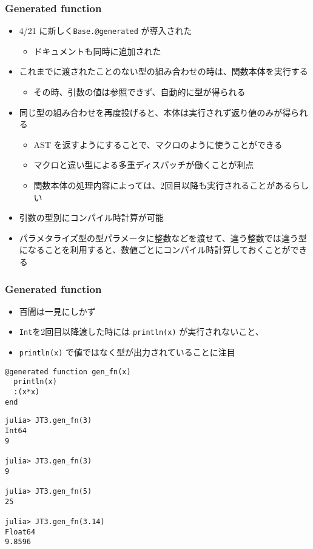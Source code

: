 \begin{frame}[containsverbatim]
\frametitle{Generated function}
\begin{itemize}
  \item 4/21 に新しく\verb|Base.@generated| が導入された
    \begin{itemize}
      \item ドキュメントも同時に追加された
    \end{itemize}
  \item これまでに渡されたことのない型の組み合わせの時は、関数本体を実行する
    \begin{itemize}
      \item その時、引数の値は参照できず、自動的に型が得られる
    \end{itemize}
  \item 同じ型の組み合わせを再度投げると、本体は実行されず返り値のみが得られる
    \begin{itemize}
      \item AST を返すようにすることで、マクロのように使うことができる
      \item マクロと違い型による多重ディスパッチが働くことが利点
      \item 関数本体の処理内容によっては、2回目以降も実行されることがあるらしい
    \end{itemize}
  \item 引数の型別にコンパイル時計算が可能
  \item パラメタライズ型の型パラメータに整数などを渡せて、違う整数では違う型になることを利用すると、数値ごとにコンパイル時計算しておくことができる
\end{itemize}
\end{frame}

\begin{frame}
\frametitle{Generated function}
\begin{itemize}
  \item 百聞は一見にしかず
  \item \verb|Int|を2回目以降渡した時には \verb|println(x)| が実行されないこと、
  \item \verb|println(x)| で値ではなく型が出力されていることに注目
\end{itemize}
\begin{lstlisting}
@generated function gen_fn(x)
  println(x)
  :(x*x)
end
\end{lstlisting}
\begin{lstlisting}
julia> JT3.gen_fn(3)
Int64
9

julia> JT3.gen_fn(3)
9

julia> JT3.gen_fn(5)
25

julia> JT3.gen_fn(3.14)
Float64
9.8596
\end{lstlisting}
\end{frame}

